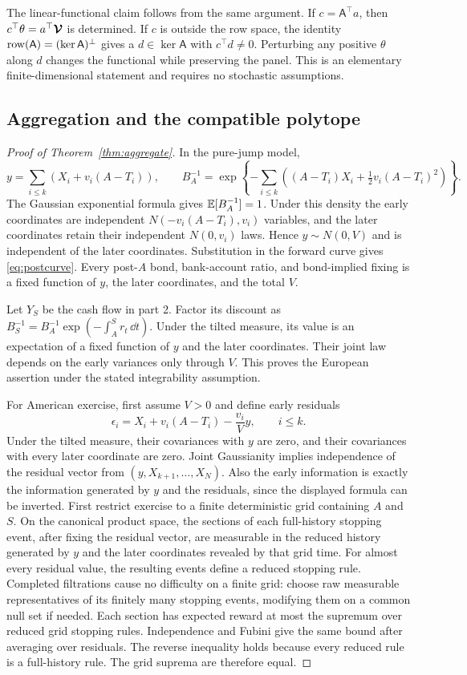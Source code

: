 The linear-functional claim follows from the same argument. If $c=\mathsf A^\top a$, then $c^\top\theta=a^\top\boldsymbol{\mathcal V}$ is determined. If $c$ is outside the row space, the identity $\operatorname{row}(\mathsf A)=(\ker\mathsf A)^\perp$ gives a $d\in\ker\mathsf A$ with $c^\top d\ne0$. Perturbing any positive $\theta$ along $d$ changes the functional while preserving the panel. This is an elementary finite-dimensional statement and requires no stochastic assumptions.

\subsection{Aggregation and the compatible polytope}\label{app:aggregation}
\begin{proof}[Proof of Theorem~\ref{thm:aggregate}]
In the pure-jump model,
\[
y=\sum_{i\leq k}(X_i+v_i (A-T_i)),\qquad
B_A^{-1}=\exp\left\{-\sum_{i\leq k}((A-T_i)X_i+\tfrac12v_i (A-T_i)^2)\right\}.
\]
The Gaussian exponential formula gives $\mathbb E[B_A^{-1}]=1$. Under this density the early coordinates are independent $N(-v_i (A-T_i),v_i)$ variables, and the later coordinates retain their independent $N(0,v_i)$ laws. Hence $y\sim N(0,V)$ and is independent of the later coordinates. Substitution in the forward curve gives \eqref{eq:postcurve}. Every post-$A$ bond, bank-account ratio, and bond-implied fixing is a fixed function of $y$, the later coordinates, and the total $V$.

Let $Y_S$ be the cash flow in part 2. Factor its discount as $B_S^{-1}=B_A^{-1}\exp(-\int_A^S r_t\,\dd t)$. Under the tilted measure, its value is an expectation of a fixed function of $y$ and the later coordinates. Their joint law depends on the early variances only through $V$. This proves the European assertion under the stated integrability assumption.

For American exercise, first assume $V>0$ and define early residuals
\[
\epsilon_i=X_i+v_i (A-T_i)-\frac{v_i}{V}y,\qquad i\leq k.
\]
Under the tilted measure, their covariances with $y$ are zero, and their covariances with every later coordinate are zero. Joint Gaussianity implies independence of the residual vector from $(y,X_{k+1},\ldots,X_N)$. Also the early information is exactly the information generated by $y$ and the residuals, since the displayed formula can be inverted. First restrict exercise to a finite deterministic grid containing $A$ and $S$. On the canonical product space, the sections of each full-history stopping event, after fixing the residual vector, are measurable in the reduced history generated by $y$ and the later coordinates revealed by that grid time. For almost every residual value, the resulting events define a reduced stopping rule. Completed filtrations cause no difficulty on a finite grid: choose raw measurable representatives of its finitely many stopping events, modifying them on a common null set if needed. Each section has expected reward at most the supremum over reduced grid stopping rules. Independence and Fubini give the same bound after averaging over residuals. The reverse inequality holds because every reduced rule is a full-history rule. The grid suprema are therefore equal.


\end{proof}
